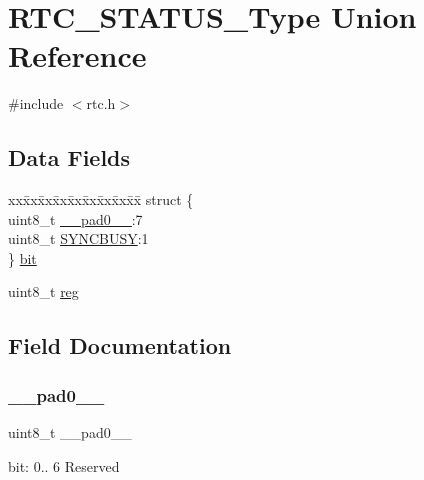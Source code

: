 \hypertarget{union_r_t_c___s_t_a_t_u_s___type}{}\section{R\+T\+C\+\_\+\+S\+T\+A\+T\+U\+S\+\_\+\+Type Union Reference}
\label{union_r_t_c___s_t_a_t_u_s___type}


{\ttfamily \#include $<$rtc.\+h$>$}

\subsection*{Data Fields}
\begin{DoxyCompactItemize}
\item 
\begin{tabbing}
xx\=xx\=xx\=xx\=xx\=xx\=xx\=xx\=xx\=\kill
struct \{\\
\>uint8\_t \mbox{\hyperlink{union_r_t_c___s_t_a_t_u_s___type_a8b4eebe79ded0459acec2f4950102ba3}{\_\_pad0\_\_}}:7\\
\>uint8\_t \mbox{\hyperlink{union_r_t_c___s_t_a_t_u_s___type_abb30254758e23bd24824e436a1aa8716}{SYNCBUSY}}:1\\
\} \mbox{\hyperlink{union_r_t_c___s_t_a_t_u_s___type_ac954fa2bf78266aa5f47f48dd489511c}{bit}}\\

\end{tabbing}\item 
uint8\+\_\+t \mbox{\hyperlink{union_r_t_c___s_t_a_t_u_s___type_a9428adc9af4653a2050e2536b55dec8d}{reg}}
\end{DoxyCompactItemize}


\subsection{Field Documentation}
\mbox{\label{union_r_t_c___s_t_a_t_u_s___type_a8b4eebe79ded0459acec2f4950102ba3}} 
\subsubsection{\texorpdfstring{\_\_pad0\_\_}{\_\_pad0\_\_}}
{\footnotesize\ttfamily uint8\+\_\+t \+\_\+\+\_\+pad0\+\_\+\+\_\+}

bit\+: 0.. 6 Reserved \mbox{\label{union_r_t_c___s_t_a_t_u_s___type_ac954fa2bf78266aa5f47f48dd489511c}} 
